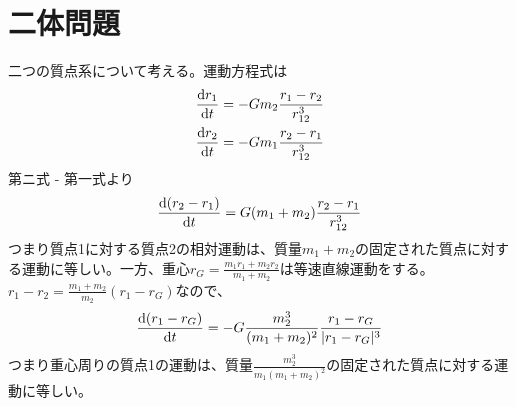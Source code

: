 \section{二体問題}
	二つの質点系について考える。運動方程式は
	\begin{gather*}
		\de[r_1]{t} = - Gm_2\frac{r_1 - r_2}{r_{12}^3}\\
		\de[r_2]{t} = - Gm_1\frac{r_2 - r_1}{r_{12}^3}\\
	\end{gather*}
	第ニ式 - 第一式より
		\[\de[(r_2 - r_1)]{t} = G(m_1 + m_2)\frac{r_2 - r_1}{r_{12}^3}\]
	つまり質点1に対する質点2の相対運動は、質量$m_1 + m_2$の固定された質点に対する運動に等しい。一方、重心$r_G = \frac{m_1r_1 + m_2r_2}{m_1 + m_2}$は等速直線運動をする。$r_1 - r_2 = \frac{m_1 + m_2}{m_2}(r_1 - r_G)$なので、
	    \[\de[(r_1 - r_G)]{t} = - G\frac{m_2^3}{(m_1 + m_2)^2}\frac{r_1 - r_G}{|r_1 - r_G|^3}\]
	つまり重心周りの質点1の運動は、質量$\frac{m_2^3}{m_1(m_1 + m_2)^2}$の固定された質点に対する運動に等しい。